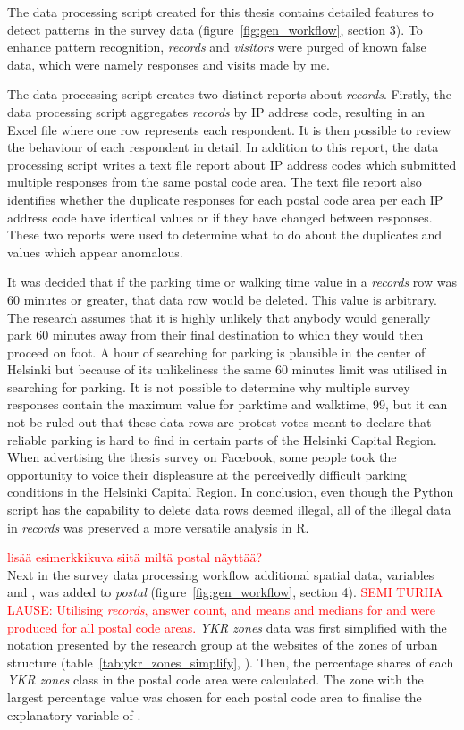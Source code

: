 The data processing script created for this thesis contains detailed features to detect patterns in the survey data (figure~\ref{fig:gen_workflow}, section 3). To enhance pattern recognition, \textit{records} and \textit{visitors} were purged of known false data, which were namely responses and visits made by me.

The data processing script creates two distinct reports about \textit{records}. Firstly, the data processing script aggregates \textit{records} by IP address code, resulting in an Excel file where one row represents each respondent. It is then possible to review the behaviour of each respondent in detail. In addition to this report, the data processing script writes a text file report about IP address codes which submitted multiple responses from the same postal code area. The text file report also identifies whether the duplicate responses for each postal code area per each IP address code have identical values or if they have changed between responses. These two reports were used to determine what to do about the duplicates and values which appear anomalous.

It was decided that if the parking time or walking time value in a \textit{records} row was 60 minutes or greater, that data row would be deleted. This value is arbitrary. The research assumes that it is highly unlikely that anybody would generally park 60 minutes away from their final destination to which they would then proceed on foot. A hour of searching for parking is plausible in the center of Helsinki but because of its unlikeliness the same 60 minutes limit was utilised in searching for parking. It is not possible to determine why multiple survey responses contain the maximum value for parktime and walktime, 99, but it can not be ruled out that these data rows are protest votes meant to declare that reliable parking is hard to find in certain parts of the Helsinki Capital Region. When advertising the thesis survey on Facebook, some people took the opportunity to voice their displeasure at the perceivedly difficult parking conditions in the Helsinki Capital Region. In conclusion, even though the Python script has the capability to delete data rows deemed illegal, all of the illegal data in \textit{records} was preserved a more versatile analysis in R.

\textcolor{red}{lisää esimerkkikuva siitä miltä postal näyttää?}\\
Next in the survey data processing workflow additional spatial data, variables  and , was added to \textit{postal} (figure~\ref{fig:gen_workflow}, section 4). \textcolor{red}{SEMI TURHA LAUSE: Utilising \textit{records}, answer count, and means and medians for  and  were produced for all postal code areas.} \textit{YKR zones} data was first simplified with the notation presented by the research group at the websites of the zones of urban structure (table~\ref{tab:ykr_zones_simplify}, \cite{FinnishEnvironmentInstitute2013}). Then, the percentage shares of each \textit{YKR zones} class in the postal code area were calculated. The zone with the largest percentage value was chosen for each postal code area to finalise the explanatory variable of .


